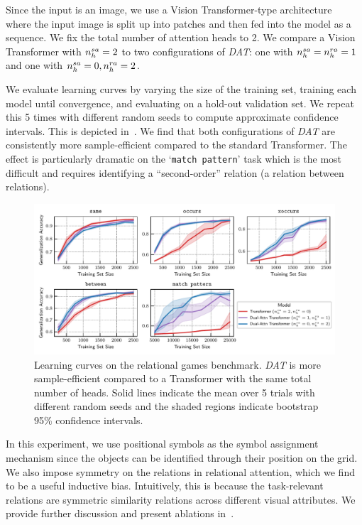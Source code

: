 Since the input is an image, we use a Vision Transformer-type architecture~\citep{dosovitskiyImageWorth16x162020} where the input image is split up into patches and then fed into the model as a sequence. We fix the total number of attention heads to 2. We compare a Vision Transformer with $n_h^{sa} = 2$ to two configurations of \textit{DAT}: one with $n_h^{sa} =  n_h^{ra} = 1$ and one with $n_h^{sa} = 0, n_h^{ra} = 2$.

We evaluate learning curves by varying the size of the training set, training each model until convergence, and evaluating on a hold-out validation set. We repeat this 5 times with different random seeds to compute approximate confidence intervals. This is depicted in~. We find that both configurations of \textit{DAT} are consistently more sample-efficient compared to the standard Transformer. The effect is particularly dramatic on the `\texttt{match pattern}' task which is the most difficult and requires identifying a ``second-order'' relation (a relation between relations).

\begin{figure}
    \includegraphics[width=\textwidth]{figs/experiments/relgames/relgames_learning_curves.pdf}
    \caption{Learning curves on the relational games benchmark. \textit{DAT} is more sample-efficient compared to a Transformer with the same total number of heads. Solid lines indicate the mean over 5 trials with different random seeds and the shaded regions indicate bootstrap 95\% confidence intervals.}\label{fig:relgames_learning_curves}
\end{figure}

In this experiment, we use positional symbols as the symbol assignment mechanism since the objects can be identified through their position on the grid. We also impose symmetry on the relations in relational attention, which we find to be a useful inductive bias. Intuitively, this is because the task-relevant relations are symmetric similarity relations across different visual attributes. We provide further discussion and present ablations in~.

